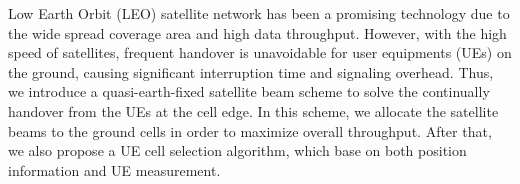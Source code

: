 
Low Earth Orbit (LEO) satellite network has been a promising technology due to the wide spread coverage area and high data throughput. However, with the high speed of satellites, frequent handover is unavoidable for user equipments (UEs) on the ground, causing significant interruption time and signaling overhead. Thus, we introduce a quasi-earth-fixed satellite beam scheme to solve the continually handover from the UEs at the cell edge. In this scheme, we allocate the satellite beams to the ground cells in order to maximize overall throughput. After that, we also propose a UE cell selection algorithm, which base on both position information and UE measurement. 